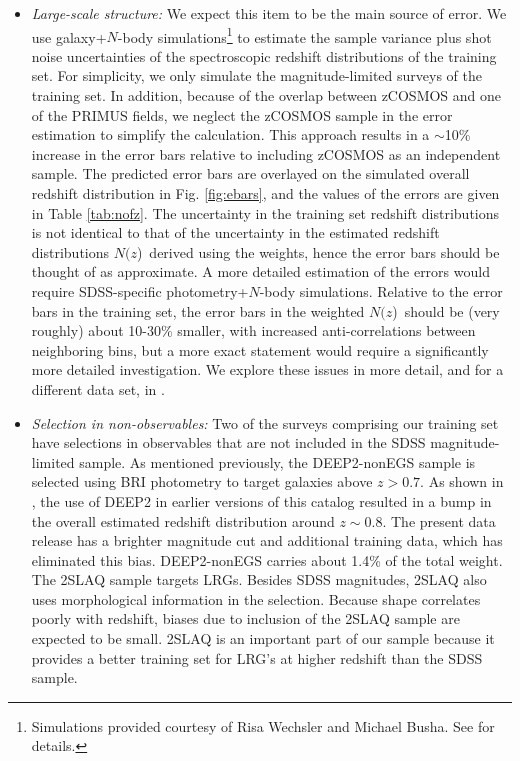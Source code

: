\documentclass[12pt,preprint]{aastex}
\newcommand{\nofz}{$N(z$)}
\begin{document}
\begin{itemize}

\item {\it Large-scale structure: } We expect this item to be the main source of
error.  We use galaxy+$N$-body simulations\footnote{Simulations provided courtesy of Risa Wechsler and
Michael Busha. See \cite{bushasimulations} for details.}
 to estimate the sample variance plus shot
noise uncertainties of the spectroscopic redshift distributions of the training
set.  For simplicity, we only simulate the magnitude-limited surveys of the
training set.  In addition, because of the overlap between zCOSMOS and one of
the PRIMUS fields, we neglect the zCOSMOS sample in the error estimation to
simplify the calculation.  This approach results in a $\sim$10\% increase in the error
bars relative to including zCOSMOS as an independent sample.  The predicted
error bars are overlayed on the simulated overall redshift
distribution in Fig.
\ref{fig:ebars}, and the values of the errors are given in Table \ref{tab:nofz}. The
uncertainty in the training set redshift distributions is not identical to that
of the uncertainty in the estimated redshift distributions \nofz\ derived using
the weights, hence the error bars should be thought of as approximate.
A more detailed estimation of the errors would require SDSS-specific
photometry+$N$-body simulations.  Relative to the error bars in the
training set, the error bars in the weighted \nofz\ should be (very roughly)
about 10-30\% smaller, with increased anti-correlations between neighboring
bins, but a more exact statement would require a significantly more
detailed investigation.
We explore these issues in more detail, and for a different data set,
in \citet{CunhaPhotozLSS11}.


\item {\it Selection in non-observables: } Two of the surveys comprising our
training set have selections in observables that are not included in the SDSS
magnitude-limited sample.  As mentioned previously, the DEEP2-nonEGS sample is
selected using BRI photometry to target galaxies above $z>0.7$.  As shown in
\citet{CunhaPhotoz09}, the use of DEEP2 in earlier versions of this catalog
resulted in a bump in the overall estimated redshift distribution around $z\sim
0.8$.  The present data release has a brighter magnitude cut and additional
training data, which has eliminated this bias.  
DEEP2-nonEGS carries about 1.4\% of the total weight.  The 2SLAQ sample targets
LRGs.  Besides SDSS magnitudes, 2SLAQ also uses morphological information in the
selection.  Because shape correlates poorly with redshift, biases due to inclusion of the
2SLAQ sample are expected to be small.  2SLAQ is an important part of our
sample because it provides a better training set for LRG's at higher redshift
than the SDSS sample.


\end{itemize}
\end{document}
